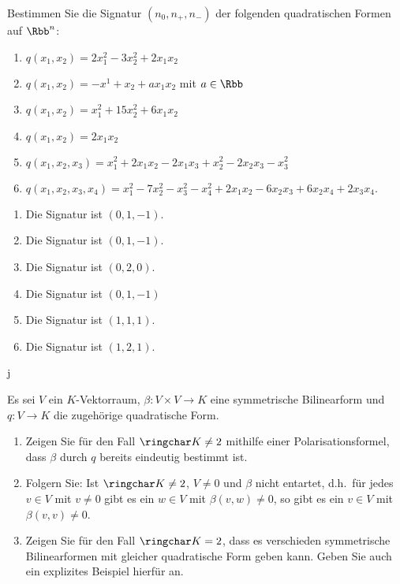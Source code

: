 


\begin{question}
  Bestimmen Sie die Signatur $(n_0, n_+, n_-)$ der folgenden quadratischen Formen auf $\Rbb^n$:
  \begin{enumerate}[leftmargin=*]
    \item
      $
          q(x_1, x_2)
        = 2 x_1^2 - 3 x_2^2 + 2 x_1 x_2
      $
    \item
      $
          q(x_1, x_2)
        = - x^1 + x_2 + a x_1 x_2
      $
      mit $a \in \Rbb$
    \item
      $
          q(x_1, x_2)
        = x_1^2 + 15 x_2^2 + 6 x_1 x_2
      $
    \item
      $
          q(x_1, x_2)
        = 2 x_1 x_2
      $
    \item
      $
          q(x_1, x_2, x_3)
        = x_1^2 + 2 x_1 x_2 - 2 x_1 x_3 + x_2^2 - 2 x_2 x_3 - x_3^2
      $
    \item
      $
          q(x_1, x_2, x_3, x_4)
        = x_1^2 - 7 x_2^2 - x_3^2 - x_4^2 + 2 x_1 x_2 - 6 x_2 x_3 + 6 x_2 x_4 + 2 x_3 x_4.
      $
  \end{enumerate}
\end{question}
\begin{solution}
  \begin{enumerate}[leftmargin=*]
    \item
      Die Signatur ist $(0,1,-1)$.
    \item
      Die Signatur ist $(0,1,-1)$.
    \item
      Die Signatur ist $(0,2,0)$.
    \item
      Die Signatur ist $(0,1,-1)$
    \item
      Die Signatur ist $(1,1,1)$.
    \item
      Die Signatur ist $(1,2,1)$.
  \end{enumerate}
\end{solution}

j


\begin{question}
  Es sei $V$ ein $K$-Vektorraum, $\beta \colon V \times V \to K$ eine symmetrische Bilinearform und $q \colon V \to K$ die zugehörige quadratische Form.
  \begin{enumerate}[leftmargin=*]
    \item
      Zeigen Sie für den Fall $\ringchar K \neq 2$ mithilfe einer Polarisationsformel, dass $\beta$ durch $q$ bereits eindeutig bestimmt ist.
    \item
      Folgern Sie:
      Ist $\ringchar K \neq 2$, $V \neq 0$ und $\beta$ nicht entartet, d.h.\ für jedes $v \in V$ mit $v \neq 0$ gibt es ein $w \in V$ mit $\beta(v, w) \neq 0$, so gibt es ein $v \in V$ mit $\beta(v,v) \neq 0$.
    \item
      Zeigen Sie für den Fall $\ringchar K = 2$, dass es verschieden symmetrische Bilinearformen mit gleicher quadratische Form geben kann.
      Geben Sie auch ein explizites Beispiel hierfür an.
  \end{enumerate}
\end{question}


